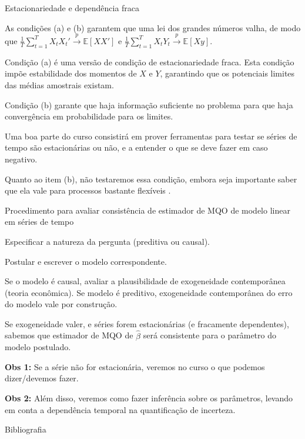 \documentclass[11pt]{beamer}
\newenvironment{halfwideitemize}{\itemize\addtolength{\itemsep}{0.5em}}{\enditemize}
\newenvironment{halfwideenumerate}{\enumerate\addtolength{\itemsep}{0.5em}}{\endenumerate}
\begin{document}
	\begin{frame}{Estacionariedade e dependência fraca}
		\begin{halfwideitemize}
			\item As condições (a) e (b) garantem que uma lei dos grandes números valha, de modo que $\frac{1}{T}\sum_{t=1}^T X_t X_t' \overset{p}{\to} \mathbb{E}[XX']$ e $\frac{1}{T}\sum_{t=1}^T X_t Y_t \overset{p}{\to} \mathbb{E}[X y]$.
			\begin{halfwideitemize}
				\item Condição (a) é uma versão de condição de {\color{blue}estacionariedade fraca}. Esta condição impõe estabilidade dos momentos de $X$ e $Y$, garantindo que os potenciais limites das médias amostrais existam.
				\item Condição (b) garante que haja informação suficiente no problema para que haja convergência em probabilidade para os limites.
			\end{halfwideitemize}
			\item Uma boa parte do curso consistirá em prover ferramentas para testar se séries de tempo são estacionárias ou não, e a entender o que se deve fazer em caso negativo. 
			\item Quanto ao item (b), não testaremos essa condição, embora seja importante saber que ela vale para processos bastante flexíveis \citep{Carrasco2002}.
		\end{halfwideitemize}
	\end{frame}
	
	\begin{frame}{Procedimento para avaliar consistência de estimador de MQO de modelo linear em séries de tempo}
		\begin{halfwideenumerate}
			\item Especificar a natureza da pergunta (preditiva ou causal). 
			\item Postular e escrever o modelo correspondente.
			\item Se o modelo é causal, avaliar a plausibilidade de exogeneidade contemporânea (teoria econômica). Se modelo é preditivo, exogeneidade contemporânea do erro do modelo vale por construção.
			\item Se exogeneidade valer, e séries forem estacionárias (e fracamente dependentes), sabemos que estimador de MQO de $\hat{\beta}$ será consistente para o parâmetro do modelo postulado.

		\end{halfwideenumerate}
		\vspace{1em}
			\textbf{Obs 1:} Se a série não for estacionária, veremos no curso o que podemos dizer/devemos fazer.
			
			\vspace{1em}
			\textbf{Obs 2:} Além disso, veremos como fazer inferência sobre os parâmetros, levando em conta a dependência temporal na quantificação de incerteza.
		\end{frame}
	\begin{frame}[allowframebreaks]{Bibliografia}
	\printbibliography
	\end{frame}
\end{document}
